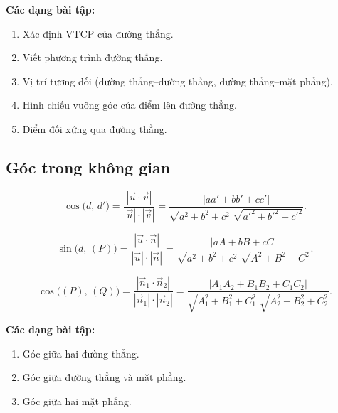 \documentclass[12pt,a4paper]{article}
\begin{document}
\medskip\noindent\textbf{Các dạng bài tập:}
\begin{enumerate}[label=\textbf{Dạng \arabic*:}, leftmargin=*, align=left]
  \item Xác định VTCP của đường thẳng.
  \item Viết phương trình đường thẳng.
  \item Vị trí tương đối (đường thẳng--đường thẳng, đường thẳng--mặt phẳng).
  \item Hình chiếu vuông góc của điểm lên đường thẳng.
  \item Điểm đối xứng qua đường thẳng.
\end{enumerate}

\subsection{Góc trong không gian}

\begin{congthuc}[title={Góc giữa hai đường thẳng $d(\vec{u})$ và $d'(\vec{v})$}]
  \[
    \cos\bigl(d,\, d'\bigr)
    = \frac{|\vec{u} \cdot \vec{v}|}{|\vec{u}| \cdot |\vec{v}|}
    = \frac{|aa' + bb' + cc'|}{\sqrt{a^2 + b^2 + c^2}\;\sqrt{a'^2 + b'^2 + c'^2}}.
  \]
\end{congthuc}

\begin{congthuc}[title={Góc giữa đường thẳng $d(\vec{u})$ và mặt phẳng $(P)(\vec{n})$}]
  \[
    \sin\bigl(d,\, (P)\bigr)
    = \frac{|\vec{u} \cdot \vec{n}|}{|\vec{u}| \cdot |\vec{n}|}
    = \frac{|aA + bB + cC|}{\sqrt{a^2 + b^2 + c^2}\;\sqrt{A^2 + B^2 + C^2}}.
  \]
\end{congthuc}

\begin{congthuc}[title={Góc giữa hai mặt phẳng $(P)(\vec{n}_1)$ và $(Q)(\vec{n}_2)$}]
  \[
    \cos\bigl((P),\, (Q)\bigr)
    = \frac{|\vec{n}_1 \cdot \vec{n}_2|}{|\vec{n}_1| \cdot |\vec{n}_2|}
    = \frac{|A_1 A_2 + B_1 B_2 + C_1 C_2|}{\sqrt{A_1^2 + B_1^2 + C_1^2}\;\sqrt{A_2^2 + B_2^2 + C_2^2}}.
  \]
\end{congthuc}

\medskip\noindent\textbf{Các dạng bài tập:}
\begin{enumerate}[label=\textbf{Dạng \arabic*:}, leftmargin=*, align=left]
  \item Góc giữa hai đường thẳng.
  \item Góc giữa đường thẳng và mặt phẳng.
  \item Góc giữa hai mặt phẳng.
\end{enumerate}
\end{document}
